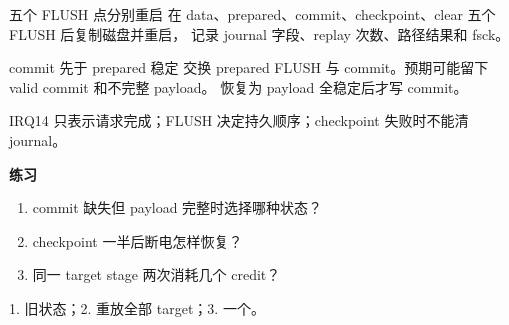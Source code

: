 
\begin{experimentbox}{五个 FLUSH 点分别重启}
在 data、prepared、commit、checkpoint、clear 五个 FLUSH 后复制磁盘并重启，
记录 journal 字段、replay 次数、路径结果和 fsck。
\end{experimentbox}

\begin{faultinjectionbox}{commit 先于 prepared 稳定}
交换 prepared FLUSH 与 commit。预期可能留下 valid commit 和不完整 payload。
恢复为 payload 全稳定后才写 commit。
\end{faultinjectionbox}

\begin{pitfallbox}
IRQ14 只表示请求完成；FLUSH 决定持久顺序；checkpoint 失败时不能清 journal。
\end{pitfallbox}

\textbf{练习}
\begin{enumerate}[leftmargin=2.2em]
  \item commit 缺失但 payload 完整时选择哪种状态？
  \item checkpoint 一半后断电怎样恢复？
  \item 同一 target stage 两次消耗几个 credit？
\end{enumerate}
\begin{answerbox}
1. 旧状态；2. 重放全部 target；3. 一个。
\end{answerbox}
